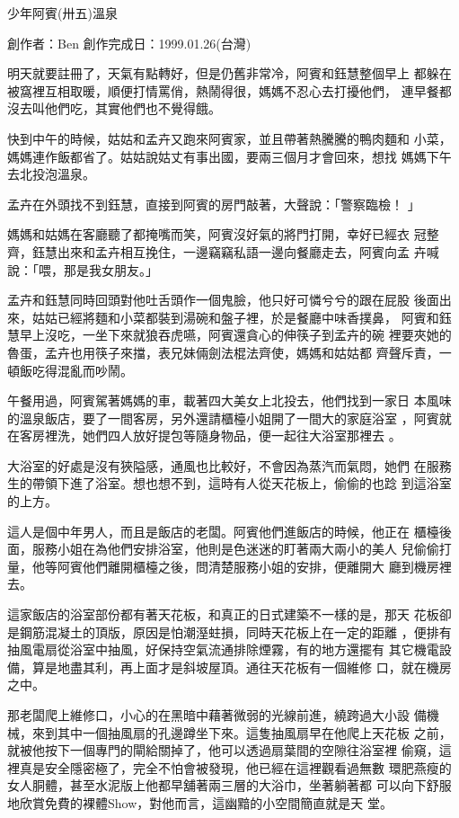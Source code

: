 



少年阿賓(卅五)溫泉

創作者：Ben
創作完成日：1999.01.26(台灣)


明天就要註冊了，天氣有點轉好，但是仍舊非常冷，阿賓和鈺慧整個早上
都躲在被窩裡互相取暖，順便打情罵俏，熱鬧得很，媽媽不忍心去打擾他們，
連早餐都沒去叫他們吃，其實他們也不覺得餓。

快到中午的時候，姑姑和孟卉又跑來阿賓家，並且帶著熱騰騰的鴨肉麵和
小菜，媽媽連作飯都省了。姑姑說姑丈有事出國，要兩三個月才會回來，想找
媽媽下午去北投泡溫泉。

孟卉在外頭找不到鈺慧，直接到阿賓的房門敲著，大聲說：「警察臨檢！
」

媽媽和姑媽在客廳聽了都掩嘴而笑，阿賓沒好氣的將門打開，幸好已經衣
冠整齊，鈺慧出來和孟卉相互挽住，一邊竊竊私語一邊向餐廳走去，阿賓向孟
卉喊說：「喂，那是我女朋友。」

孟卉和鈺慧同時回頭對他吐舌頭作一個鬼臉，他只好可憐兮兮的跟在屁股
後面出來，姑姑已經將麵和小菜都裝到湯碗和盤子裡，於是餐廳中味香撲鼻，
阿賓和鈺慧早上沒吃，一坐下來就狼吞虎嚥，阿賓還貪心的伸筷子到孟卉的碗
裡要夾她的魯蛋，孟卉也用筷子來擋，表兄妹倆劍法棍法齊使，媽媽和姑姑都
齊聲斥責，一頓飯吃得混亂而吵鬧。

午餐用過，阿賓駕著媽媽的車，載著四大美女上北投去，他們找到一家日
本風味的溫泉飯店，要了一間客房，另外還請櫃檯小姐開了一間大的家庭浴室
，阿賓就在客房裡洗，她們四人放好提包等隨身物品，便一起往大浴室那裡去
。

大浴室的好處是沒有狹隘感，通風也比較好，不會因為蒸汽而氣悶，她們
在服務生的帶領下進了浴室。想也想不到，這時有人從天花板上，偷偷的也踗
到這浴室的上方。

這人是個中年男人，而且是飯店的老闆。阿賓他們進飯店的時候，他正在
櫃檯後面，服務小姐在為他們安排浴室，他則是色迷迷的盯著兩大兩小的美人
兒偷偷打量，他等阿賓他們離開櫃檯之後，問清楚服務小姐的安排，便離開大
廳到機房裡去。

這家飯店的浴室部份都有著天花板，和真正的日式建築不一樣的是，那天
花板卻是鋼筋混凝土的頂版，原因是怕潮溼蛀損，同時天花板上在一定的距離
，便排有抽風電扇從浴室中抽風，好保持空氣流通排除煙霧，有的地方還擺有
其它機電設備，算是地盡其利，再上面才是斜坡屋頂。通往天花板有一個維修
口，就在機房之中。

那老闆爬上維修口，小心的在黑暗中藉著微弱的光線前進，繞跨過大小設
備機械，來到其中一個抽風扇的孔邊蹲坐下來。這隻抽風扇早在他爬上天花板
之前，就被他按下一個專門的閘給關掉了，他可以透過扇葉間的空隙往浴室裡
偷窺，這裡真是安全隱密極了，完全不怕會被發現，他已經在這裡觀看過無數
環肥燕瘦的女人胴體，甚至水泥版上他都早舖著兩三層的大浴巾，坐著躺著都
可以向下舒服地欣賞免費的裸體Show，對他而言，這幽黯的小空間簡直就是天
堂。

